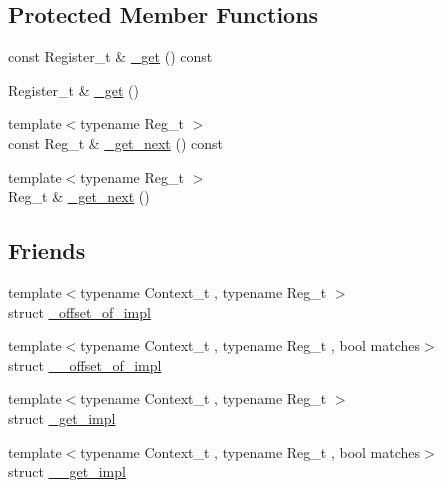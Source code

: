 \subsection*{Protected Member Functions}
\begin{DoxyCompactItemize}
\item 
const Register\+\_\+t \& \mbox{\hyperlink{classxd_1_1reg_1_1___register_context_3_01__base_00_01_register__t_00_01_registers__t_8_8_8_01_4_a266dfac6e1b5d409a7bab7efc622e16b}{\+\_\+get}} () const
\item 
Register\+\_\+t \& \mbox{\hyperlink{classxd_1_1reg_1_1___register_context_3_01__base_00_01_register__t_00_01_registers__t_8_8_8_01_4_aa624f94a836b77118baccc1ba5a92e7c}{\+\_\+get}} ()
\item 
{\footnotesize template$<$typename Reg\+\_\+t $>$ }\\const Reg\+\_\+t \& \mbox{\hyperlink{classxd_1_1reg_1_1___register_context_3_01__base_00_01_register__t_00_01_registers__t_8_8_8_01_4_a5a408dffbb51b2e1f8fb1f275f8dcf6e}{\+\_\+get\+\_\+next}} () const
\item 
{\footnotesize template$<$typename Reg\+\_\+t $>$ }\\Reg\+\_\+t \& \mbox{\hyperlink{classxd_1_1reg_1_1___register_context_3_01__base_00_01_register__t_00_01_registers__t_8_8_8_01_4_a006128b54eb90ee09610f8d314755c8b}{\+\_\+get\+\_\+next}} ()
\end{DoxyCompactItemize}
\subsection*{Friends}
\begin{DoxyCompactItemize}
\item 
{\footnotesize template$<$typename Context\+\_\+t , typename Reg\+\_\+t $>$ }\\struct \mbox{\hyperlink{classxd_1_1reg_1_1___register_context_3_01__base_00_01_register__t_00_01_registers__t_8_8_8_01_4_a6383b3f5913aa0e0cd14b1f735947b75}{\+\_\+offset\+\_\+of\+\_\+impl}}
\item 
{\footnotesize template$<$typename Context\+\_\+t , typename Reg\+\_\+t , bool matches$>$ }\\struct \mbox{\hyperlink{classxd_1_1reg_1_1___register_context_3_01__base_00_01_register__t_00_01_registers__t_8_8_8_01_4_a5a4ed82d269229cddcca4b19c8c1ff1a}{\+\_\+\+\_\+offset\+\_\+of\+\_\+impl}}
\item 
{\footnotesize template$<$typename Context\+\_\+t , typename Reg\+\_\+t $>$ }\\struct \mbox{\hyperlink{classxd_1_1reg_1_1___register_context_3_01__base_00_01_register__t_00_01_registers__t_8_8_8_01_4_a7f3b7278ef152b0897575be3148e6970}{\+\_\+get\+\_\+impl}}
\item 
{\footnotesize template$<$typename Context\+\_\+t , typename Reg\+\_\+t , bool matches$>$ }\\struct \mbox{\hyperlink{classxd_1_1reg_1_1___register_context_3_01__base_00_01_register__t_00_01_registers__t_8_8_8_01_4_a727b2b4b89412101811b094f71b72215}{\+\_\+\+\_\+get\+\_\+impl}}
\end{DoxyCompactItemize}


